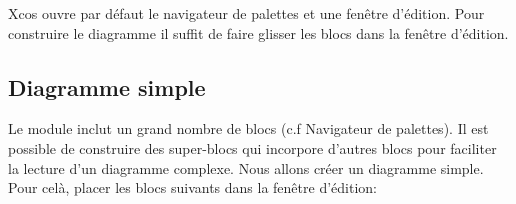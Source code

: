 Xcos ouvre par défaut le navigateur de palettes et une fenêtre d'édition. 
Pour construire le diagramme il suffit de faire glisser les blocs dans la 
fenêtre d'édition.

\subsection{Diagramme simple}

Le module inclut un grand nombre de blocs (c.f Navigateur de palettes).
Il est possible de construire des super-blocs qui incorpore d'autres blocs pour
faciliter la lecture d'un diagramme complexe. \newline
Nous allons créer un diagramme simple. Pour celà, placer les blocs suivants 
dans la fenêtre d'édition:

